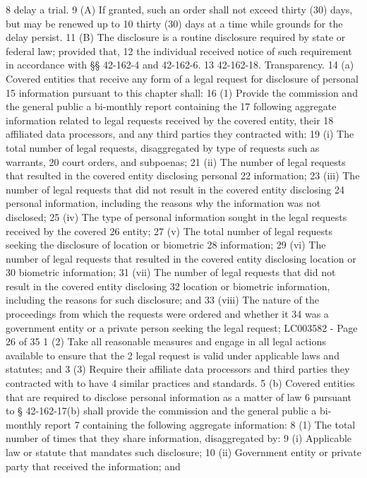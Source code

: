 8 delay a trial.
9 (A) If granted, such an order shall not exceed thirty (30) days, but may be renewed up to
10 thirty (30) days at a time while grounds for the delay persist.
11 (B) The disclosure is a routine disclosure required by state or federal law; provided that,
12 the individual received notice of such requirement in accordance with §§ 42-162-4 and 42-162-6.
13 42-162-18. Transparency.
14 (a) Covered entities that receive any form of a legal request for disclosure of personal
15 information pursuant to this chapter shall:
16 (1) Provide the commission and the general public a bi-monthly report containing the
17 following aggregate information related to legal requests received by the covered entity, their
18 affiliated data processors, and any third parties they contracted with:
19 (i) The total number of legal requests, disaggregated by type of requests such as warrants,
20 court orders, and subpoenas;
21 (ii) The number of legal requests that resulted in the covered entity disclosing personal
22 information;
23 (iii) The number of legal requests that did not result in the covered entity disclosing
24 personal information, including the reasons why the information was not disclosed;
25 (iv) The type of personal information sought in the legal requests received by the covered
26 entity;
27 (v) The total number of legal requests seeking the disclosure of location or biometric
28 information;
29 (vi) The number of legal requests that resulted in the covered entity disclosing location or
30 biometric information;
31 (vii) The number of legal requests that did not result in the covered entity disclosing
32 location or biometric information, including the reasons for such disclosure; and
33 (viii) The nature of the proceedings from which the requests were ordered and whether it
34 was a government entity or a private person seeking the legal request;
LC003582 - Page 26 of 35
1 (2) Take all reasonable measures and engage in all legal actions available to ensure that the
2 legal request is valid under applicable laws and statutes; and
3 (3) Require their affiliate data processors and third parties they contracted with to have
4 similar practices and standards.
5 (b) Covered entities that are required to disclose personal information as a matter of law
6 pursuant to § 42-162-17(b) shall provide the commission and the general public a bi-monthly report
7 containing the following aggregate information:
8 (1) The total number of times that they share information, disaggregated by:
9 (i) Applicable law or statute that mandates such disclosure;
10 (ii) Government entity or private party that received the information; and

